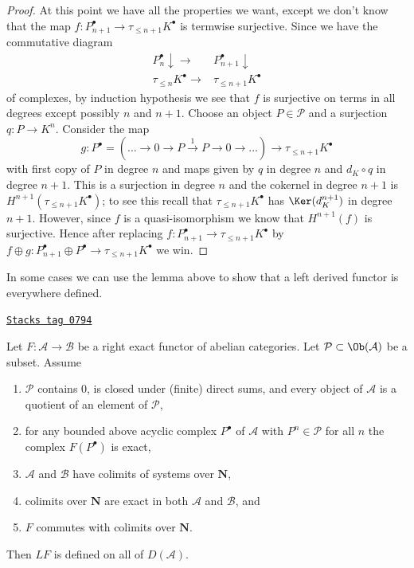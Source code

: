 \begin{proof}
\medskip\noindent
At this point we have all the properties we want, except we don't know
that the map $f : P_{n + 1}^\bullet \to \tau_{\leq n + 1}K^\bullet$
is termwise surjective. Since we have the commutative diagram
$$
\begin{array}{cc}P_n^\bullet \downarrow\longrightarrow & P_{n + 1}^\bullet \downarrow \\ \tau_{\leq n}K^\bullet \longrightarrow & \tau_{\leq n + 1}K^\bullet\end{array}
$$
of complexes, by induction hypothesis we see that $f$ is surjective
on terms in all degrees except possibly $n$ and $n + 1$. Choose
an object $P \in \mathcal{P}$ and a surjection $q : P \to K^n$.
Consider the map
$$
g :
P^\bullet = (\ldots \to 0 \to P \xrightarrow{1} P \to 0 \to \ldots)
\longrightarrow
\tau_{\leq n + 1}K^\bullet
$$
with first copy of $P$ in degree $n$ and maps given by
$q$ in degree $n$ and $d_K \circ q$ in degree $n + 1$.
This is a surjection in degree $n$ and the cokernel in
degree $n + 1$ is $H^{n + 1}(\tau_{\leq n + 1}K^\bullet)$;
to see this recall that $\tau_{\leq n + 1}K^\bullet$ has
$\Ker(d_K^{n + 1})$ in degree $n + 1$.
However, since $f$ is a quasi-isomorphism we know that
$H^{n + 1}(f)$ is surjective. Hence after replacing
$f : P_{n + 1}^\bullet \to \tau_{\leq n + 1}K^\bullet$
by
$f \oplus g : P_{n + 1}^\bullet \oplus P^\bullet \to \tau_{\leq n + 1}K^\bullet$
we win.
\end{proof}

In some cases we can use the lemma above to show that a left derived
functor is everywhere defined.

\begin{proposition}
\label{derived-proposition-left-derived-exists}
\href{https://stacks.math.columbia.edu/tag/0794}{\texttt{Stacks tag 0794}}

Let $F : \mathcal{A} \to \mathcal{B}$ be a right exact functor
of abelian categories. Let $\mathcal{P} \subset \Ob(\mathcal{A})$ be a
subset. Assume
\begin{enumerate}
\item $\mathcal{P}$ contains $0$, is closed under (finite) direct sums,
and every object of $\mathcal{A}$ is a quotient of an
element of $\mathcal{P}$,
\item for any bounded above acyclic complex $P^\bullet$ of
$\mathcal{A}$ with $P^n \in \mathcal{P}$ for all $n$ the
complex $F(P^\bullet)$ is exact,
\item $\mathcal{A}$ and $\mathcal{B}$ have colimits
of systems over $\mathbf{N}$,
\item colimits over $\mathbf{N}$ are exact in both
$\mathcal{A}$ and $\mathcal{B}$, and
\item $F$ commutes with colimits over $\mathbf{N}$.
\end{enumerate}
Then $LF$ is defined on all of $D(\mathcal{A})$.
\end{proposition}

